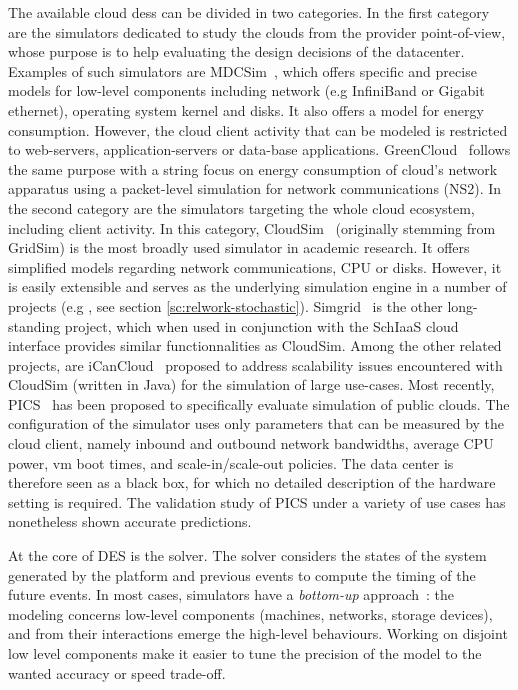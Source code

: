 \documentclass[10pt,conference,compsocconf]{IEEEtran}
\begin{document}
The available  cloud \acp{des} can  be divided in  two categories. In  the first
category are  the simulators  dedicated to  study the  clouds from  the provider
point-of-view, whose purpose  is to help evaluating the design  decisions of the
datacenter. Examples  of such simulators are  MDCSim~\cite{MDCSim}, which offers
specific  and precise  models for  low-level components  including network  (e.g
InfiniBand or  Gigabit ethernet),  operating system kernel  and disks.   It also
offers a model  for energy consumption. However, the cloud  client activity that
can be  modeled is restricted  to web-servers, application-servers  or data-base
applications.   GreenCloud~\cite{greencloud} follows  the  same  purpose with  a
string  focus  on  energy  consumption  of cloud's  network  apparatus  using  a
packet-level  simulation  for  network  communications  (NS2).   In  the  second
category  are the  simulators  targeting the  whole  cloud ecosystem,  including
client activity. In this category, CloudSim~\cite{cloudsim} (originally stemming
from  GridSim) is  the most  broadly used  simulator in  academic research.   It
offers simplified models regarding network communications, CPU or disks. However,
it is  easily extensible  and serves  as the underlying  simulation engine  in a
number of projects (e.g  \cite{Cai17}, see section \ref{sc:relwork-stochastic}).
Simgrid~\cite{simgrid} is  the other long-standing  project, which when  used in
conjunction with  the SchIaaS cloud interface  provides similar functionnalities
as CloudSim.   Among the other related  projects, are iCanCloud~\cite{iCanCloud}
proposed to  address scalability  issues encountered  with CloudSim  (written in
Java) for the simulation of large use-cases. Most recently, PICS~\cite{pics} has
been  proposed  to  specifically  evaluate simulation  of  public  clouds.   The
configuration of the simulator uses only  parameters that can be measured by the
cloud client, namely inbound and  outbound network bandwidths, average CPU power,
\ac{vm} boot times, and scale-in/scale-out  policies. The data center is therefore %
seen as a black  box, for which no detailed description  of the hardware setting
is required.  The validation  study of  PICS under  a variety  of use  cases has
nonetheless shown accurate predictions.

At the core of DES is the solver.  The solver considers the states of the system
generated  by the  platform and  previous events  to compute  the timing  of the
future events. %
In  most  cases, simulators  have  a  \emph{bottom-up} approach~:  the  modeling
concerns low-level  components (machines,  networks, storage devices),  and from
their interactions  emerge the high-level  behaviours. Working on  disjoint low
level components make it easier to tune the precision of the model to the wanted
accuracy or speed trade-off.
\end{document}
